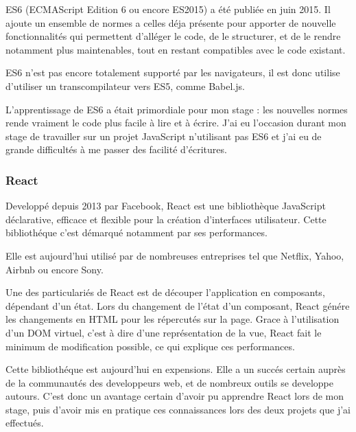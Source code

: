 \bigskip

ES6 (ECMAScript Edition 6 ou encore ES2015) a été publiée en juin 2015.
Il ajoute un ensemble de normes a celles déja présente pour apporter de
nouvelle fonctionnalités qui permettent d'alléger le code, de le
structurer, et de le rendre notamment plus maintenables, tout en restant
compatibles avec le code existant.

\bigskip

ES6 n'est pas encore totalement supporté par les navigateurs, il est
donc utilise d'utiliser un transcompilateur vers ES5, comme Babel.js.

\bigskip

L'apprentissage de ES6 a était primordiale pour mon stage : les
nouvelles normes rende vraiment le code plus facile à lire et à écrire.
J'ai eu l'occasion durant mon stage de travailler sur un projet
JavaScript n'utilisant pas ES6 et j'ai eu de grande difficultés à me
passer des facilité d'écritures.

\bigskip

\subsubsection{React}\label{react}

\bigskip

Developpé depuis 2013 par Facebook, React est une bibliothèque
JavaScript déclarative, efficace et flexible pour la création
d'interfaces utilisateur. Cette bibliothéque c'est démarqué notamment
par ses performances.

\bigskip

Elle est aujourd'hui utilisé par de nombreuses entreprises tel que
Netflix, Yahoo, Airbnb ou encore Sony.

\bigskip

Une des particulariés de React est de découper l'application en
composants, dépendant d'un état. Lors du changement de l'état d'un
composant, React génére les changements en HTML pour les répercutés sur
la page. Grace à l'utilisation d'un DOM virtuel, c'est à dire d'une
représentation de la vue, React fait le minimum de modification
possible, ce qui explique ces performances.

\bigskip

Cette bibliothéque est aujourd'hui en expensions. Elle a un succés
certain auprès de la communautés des developpeurs web, et de nombreux
outils se developpe autours. C'est donc un avantage certain d'avoir pu
apprendre React lors de mon stage, puis d'avoir mis en pratique ces
connaissances lors des deux projets que j'ai effectués.

